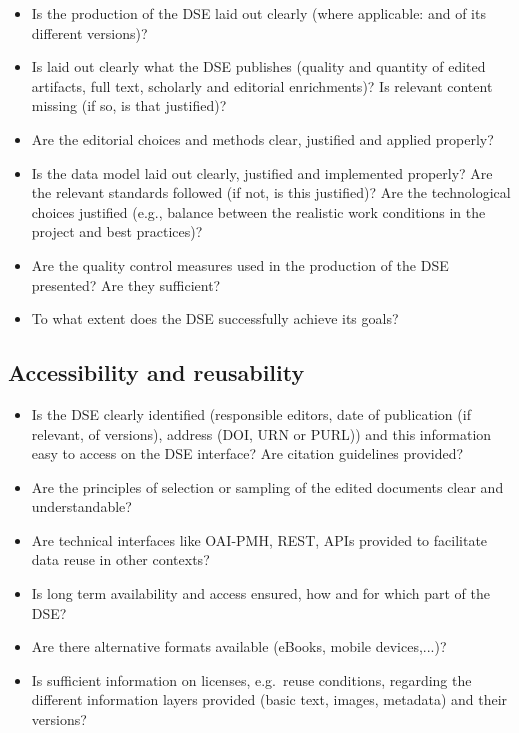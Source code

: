 \documentclass[
  letterpaper,
  DIV=11,
  numbers=noendperiod]{scrreprt}
\begin{document}
\begin{itemize}
\item
  Is the production of the DSE laid out clearly (where applicable: and
  of its different versions)?
\item
  Is laid out clearly what the DSE publishes (quality and quantity of
  edited artifacts, full text, scholarly and editorial enrichments)? Is
  relevant content missing (if so, is that justified)?
\item
  Are the editorial choices and methods clear, justified and applied
  properly?
\item
  Is the data model laid out clearly, justified and implemented
  properly? Are the relevant standards followed (if not, is this
  justified)? Are the technological choices justified (e.g., balance
  between the realistic work conditions in the project and best
  practices)?
\item
  Are the quality control measures used in the production of the DSE
  presented? Are they sufficient?
\item
  To what extent does the DSE successfully achieve its goals?\hl{}
\end{itemize}

\subsection{Accessibility and
reusability}\label{accessibility-and-reusability}

\begin{itemize}
\item
  Is the DSE clearly identified (responsible editors, date of
  publication (if relevant, of versions), address (DOI, URN or PURL))
  and this information easy to access on the DSE interface? Are citation
  guidelines provided?
\item
  Are the principles of selection or sampling of the edited documents
  clear and understandable?
\item
  Are technical interfaces like OAI-PMH, REST, APIs provided to
  facilitate data reuse in other contexts?
\item
  Is long term availability and access ensured, how and for which part
  of the DSE?
\item
  Are there alternative formats available (eBooks, mobile devices,...)?
\item
  Is sufficient information on licenses, e.g.~reuse conditions,
  regarding the different information layers provided (basic text,
  images, metadata) and their versions?
\end{itemize}
\end{document}
